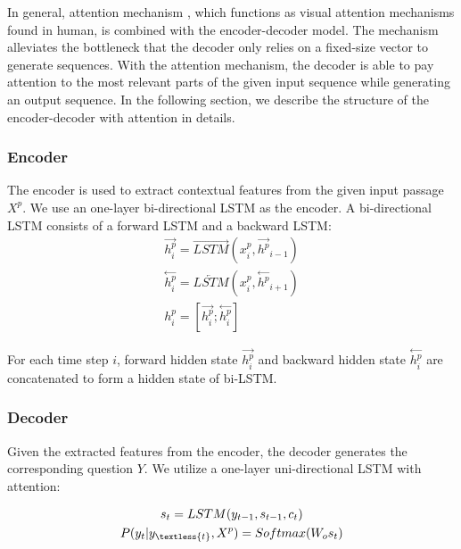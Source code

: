 \documentclass[letterpaper]{article} %
\begin{document}
In general, attention mechanism \cite{bahdanau2014neural}, which functions as visual attention mechanisms found in human, is combined with the encoder-decoder model. The mechanism alleviates the bottleneck that the decoder only relies on a fixed-size vector to generate sequences. With the attention mechanism, the decoder is able to pay attention to the most relevant parts of the given input sequence while generating an output sequence. In the following section, we describe the structure of the encoder-decoder with attention in details.

\subsubsection{Encoder}
The encoder is used to extract contextual features from the given input passage \(X^p\). We use an one-layer bi-directional LSTM as the encoder. A bi-directional LSTM consists of a forward LSTM and a backward LSTM:
\begin{gather}
\overset{\rightarrow}{h^p_i} = \overrightarrow{LSTM}(x^p_i, \overset{\rightarrow}{h^p}_{i-1})  \label{eq_3} \\
\overset{\leftarrow}{h^p_i} = \overleftarrow{LSTM}(x^p_i, \overset{\leftarrow}{h^p}_{i+1})  \label{eq_4} \\
h^p_i = [\overset{\rightarrow}{h^p_i};\overset{\leftarrow}{h^p_i}] \label{eq_5}
\end{gather}

For each time step \(i\), forward hidden state \(\overset{\rightarrow}{h^p_i}\) and backward hidden state \(\overset{\leftarrow}{h^p_i}\) are concatenated to form a hidden state of bi-LSTM.

\subsubsection{Decoder}
Given the extracted features from the encoder, the decoder generates the corresponding question \(Y\). We utilize a one-layer uni-directional LSTM with attention:

\begin{gather}
s_t = LSTM(y_{t-1}, s_{t-1}, c_t) \label{eq_6} \\
P(y_t |y_{\textless{t}}, X^p) = Softmax(W_os_t) \label{eq_7}
\end{gather}
\end{document}
